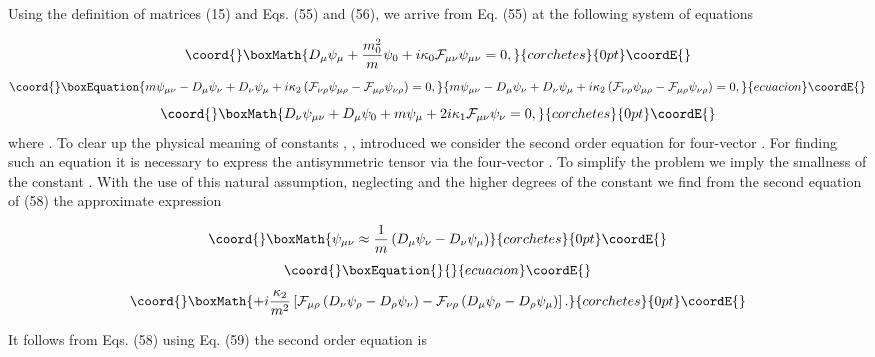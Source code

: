 \documentclass[a4paper,12pt]{article}
\begin{document}
Using the definition of matrices (15) and Eqs. (55) and (56), we
arrive from Eq. (55) at the following system of equations

\[\coord{}\boxMath{
D_\mu \psi_\mu +\frac{m_0^2}{m}\psi_0+i\kappa
_0\mathcal{F}_{\mu\nu}\psi_{\mu\nu}=0,
}{corchetes}{0pt}\coordE{}\]
\begin{equation}\coord{}\boxEquation{
m\psi_{\mu \nu }-D_\mu \psi_\nu +D_\nu
\psi_\mu+i\kappa_2\left(\mathcal{F}_{\nu\rho}\psi_{\mu\rho}-
\mathcal{F}_{\mu\rho}\psi_{\nu\rho}\right)=0, \label{58}
}{
m\psi_{\mu \nu }-D_\mu \psi_\nu +D_\nu
\psi_\mu+i\kappa_2\left(\mathcal{F}_{\nu\rho}\psi_{\mu\rho}-
\mathcal{F}_{\mu\rho}\psi_{\nu\rho}\right)=0, }{ecuacion}\coordE{}\end{equation}
\[\coord{}\boxMath{
D_\nu \psi_{\mu \nu }+D_\mu \psi_0+m \psi_\mu
+2i\kappa_1\mathcal{F}_{\mu\nu}\psi_\nu=0,
}{corchetes}{0pt}\coordE{}\]
where \myHighlight{$\psi_{\mu \nu }\equiv\psi_{[\mu \nu ]}$}\coordHE{}. To clear up the
physical meaning of constants \coordHE{}, \coordHE{}, \coordHE{}
introduced we consider the second order equation for four-vector
\myHighlight{$\psi_\mu$}\coordHE{}. For finding such an equation it is necessary to
express the antisymmetric tensor \myHighlight{$\psi_{\mu\nu}$}\coordHE{} via the
four-vector \myHighlight{$\psi_\mu$}\coordHE{}. To simplify the problem we imply the
smallness of the constant \coordHE{}. With the use of this natural
assumption, neglecting \coordHE{} and the higher degrees of the
constant \coordHE{} we find from the second equation of (58) the
approximate expression

\[\coord{}\boxMath{
\psi_{\mu \nu }\approx\frac1m \left(D_\mu \psi_\nu -D_\nu
\psi_\mu\right)
}{corchetes}{0pt}\coordE{}\]
\vspace{-8mm}
\begin{equation}\coord{}\boxEquation{
\label{59}
}{
}{ecuacion}\coordE{}\end{equation}
\vspace{-8mm}
\[\coord{}\boxMath{
+i\frac{\kappa_2}{m^2}\left[\mathcal{F}_{\mu\rho}\left(D_\nu\psi_\rho-
D_\rho\psi_\nu\right)-\mathcal{F}_{\nu\rho}\left(D_\mu\psi_\rho-
D_\rho\psi_\mu\right)\right].
}{corchetes}{0pt}\coordE{}\]

It follows from Eqs. (58) using Eq. (59) the second order equation
is
\end{document}
